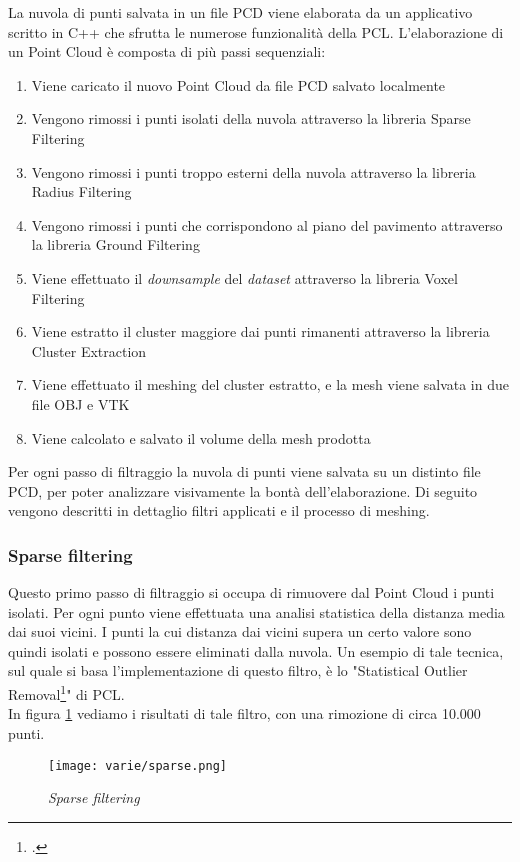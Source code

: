 La nuvola di punti salvata in un file PCD viene elaborata da un applicativo scritto in C++ che sfrutta le numerose funzionalità della PCL.
L'elaborazione di un Point Cloud è composta di più passi sequenziali:
\begin{enumerate}
\item Viene caricato il nuovo Point Cloud da file PCD salvato localmente
\item Vengono rimossi i punti isolati della nuvola attraverso la libreria Sparse Filtering
\item Vengono rimossi i punti troppo esterni della nuvola attraverso la libreria Radius Filtering 
\item Vengono rimossi i punti che corrispondono al piano del pavimento attraverso la libreria Ground Filtering
\item Viene effettuato il \emph{downsample} del \emph{dataset} attraverso la libreria Voxel Filtering
\item Viene estratto il cluster maggiore dai punti rimanenti attraverso la libreria Cluster Extraction
\item Viene effettuato il meshing del cluster estratto, e la mesh viene salvata in due file OBJ e VTK
\item Viene calcolato e salvato il volume della mesh prodotta
\end{enumerate}
Per ogni passo di filtraggio la nuvola di punti viene salvata su un distinto file PCD, per poter analizzare visivamente la bontà dell'elaborazione.
Di seguito vengono descritti in dettaglio filtri applicati e il processo di meshing.

\subsubsection{Sparse filtering}
Questo primo passo di filtraggio si occupa di rimuovere dal Point Cloud i punti isolati. Per ogni punto viene effettuata una analisi statistica della distanza media dai suoi vicini. I punti la cui distanza dai vicini supera un certo valore sono quindi isolati e possono essere eliminati dalla nuvola.
Un esempio di tale tecnica, sul quale si basa l'implementazione di questo filtro, è lo "Statistical Outlier Removal\footcite{http://pointclouds.org/documentation/tutorials/statistical_outlier.php/statistical-outlier-removal}" di PCL.\\
In figura \ref{fig:sparse} vediamo i risultati di tale filtro, con una rimozione di circa 10.000 punti.
\begin{figure}[!h] 
    \centering 
    \texttt{[image: varie/sparse.png]} 
    \caption{\emph{Sparse filtering}}
    \label{fig:sparse}
\end{figure}

